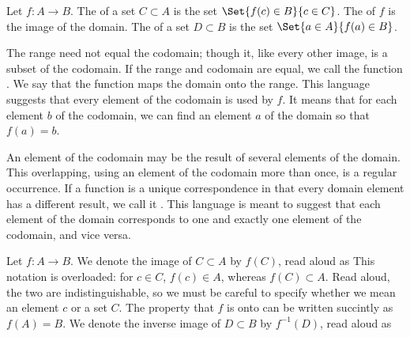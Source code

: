 
Let $f: A \to B$.
The  of a set $C \subset A$
is the set $\Set{f(c) \in B}{c \in C}$.
The  of $f$ is the image
of the domain.
The  of a set
$D \subset B$ is the set $\Set{a \in A}{f(a) \in B}$.

The range need not equal the codomain; though it,
like every other image, is a subset of the codomain.
If the range and codomain are equal,
we call the function .
We say that the function maps the domain onto the range.
This language suggests that every element of
the codomain is used by $f$.
It means that for each element $b$ of the codomain,
we can find an element $a$ of the domain so that
$f(a) = b$.

An element of the codomain may be the result
of several elements of the domain.
This overlapping, using an element of the
codomain more than once, is a regular occurrence.
If a function is a unique correspondence in that
every domain element has a different result,
we call it .
This language is meant to suggest that each
element of the domain corresponds to one and
exactly one element of the codomain, and vice versa.


Let $f: A \to B$.
We denote the image of $C \subset A$ by $f(C)$, read aloud as 
This notation is overloaded: for $c \in C$, $f(c) \in A$, whereas $f(C) \subset A$.
Read aloud, the two are indistinguishable, so we must be careful to specify whether we mean an element $c$ or a set $C$.
The property that $f$ is onto can be written succintly as $f(A) = B$.
We denote the inverse image of $D \subset B$ by $f^{-1}(D)$, read aloud as 


\strats
